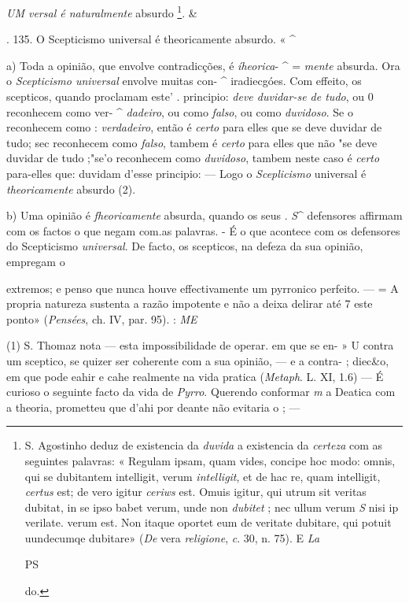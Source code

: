 \emph{UM versal é naturalmente} absurdo \footnote{S. Agostinho deduz de existencia da \emph{duvida} a existencia da \emph{certeza} com as seguintes palavras: « Regulam ipsam, quam vides, concipe hoc modo: omnis, qui se dubitantem intelligit, verum \emph{intelligit}, et de hac re, quam intelligit, \emph{certus} est; de vero igitur \emph{ceriws} est. Omuis igitur, qui utrum sit veritas dubitat, in se ipso babet verum, unde non \emph{dubitet} ; nec ullum verum \emph{S} nisi ip verilate. verum est. Non itaque oportet eum de veritate dubitare, qui \textbar{} potuit uundecumqe dubitare» (\emph{De} vera \emph{religione}, \emph{c}. 30, n. 75). E \emph{La}\par PS\par do.}. \&

. 135. O Scepticismo universal é theoricamente absurdo. « \textasciicircum{}

a) Toda a opinião, que envolve contradicções, é \emph{íheorica}- \textasciicircum{} = \emph{mente} absurda. Ora o \emph{Scepticismo universal} envolve muitas con- \textasciicircum{} iradiecgóes. Com effeito, os scepticos, quando proclamam este' . principio: \emph{deve duvidar-se de tudo}, ou 0 reconhecem como ver- \textasciicircum{} \emph{dadeiro}, ou como \emph{falso}, ou como \emph{duvidoso}. Se o reconhecem como : \emph{verdadeiro}, então é \emph{certo} para elles que se deve duvidar de tudo; sec reconhecem como \emph{falso}, tambem é \emph{certo} para elles que não "se deve duvidar de tudo ;"se'o reconhecem como \emph{duvidoso}, tambem neste caso é \emph{certo} para-elles que: duvidam d'esse principio: --- Logo o \emph{Sceplicismo} universal é \emph{theoricamente} absurdo (2).

b) Uma opinião é \emph{fheoricamente} absurda, quando os seus \textbar{}. \emph{S}\textasciicircum{} defensores affirmam com os factos o que negam com.as palavras. - É o que acontece com os defensores do Scepticismo \emph{universal}. De facto, os scepticos, na defeza da sua opinião, empregam o

extremos; e penso que nunca houve effectivamente um pyrronico perfeito. --- = A propria natureza sustenta a razão impotente e não a deixa delirar até 7 este ponto» (\emph{Pensées}, ch. IV, par. 95). : \emph{ME}

(1) S. Thomaz nota --- esta impossibilidade de operar. em que se en- » U contra um sceptico, se quizer ser coherente com a sua opinião, --- e a contra- ; diec\&o, em que pode eahir e cahe realmente na vida pratica (\emph{Metaph}. L. XI, 1.6) --- É curioso o seguinte facto da vida de \emph{Pyrro}. Querendo conformar \emph{m} a Deatica \textbar{} com a theoria, prometteu que d'ahi por deante não evitaria o ; ---

